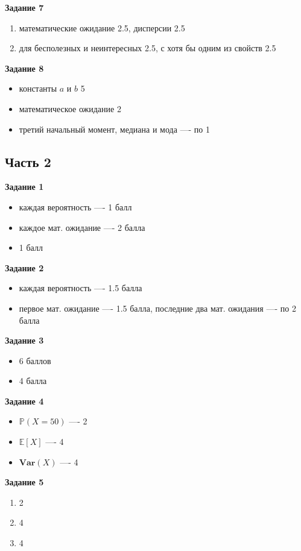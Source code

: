\documentclass[a4paper,12pt]{article}
\theoremstyle{plain}                         %
\theoremstyle{definition}                  %
\theoremstyle{remark}                      %
\begin{document}
\textbf{Задание 7}
\begin{enumerate}
\item математические ожидание 2.5, дисперсии 2.5
\item для бесполезных и неинтересных 2.5, с хотя бы одним из свойств 2.5

\end{enumerate}

\textbf{Задание 8}
\begin{itemize}
\item константы $a$ и $b$ 5
\item математическое ожидание 2
\item третий начальный момент, медиана и мода —- по 1
\end{itemize}

\begin{center}
\subsection*{Часть 2}
\end{center}

\textbf{Задание 1}
\begin{itemize}
\item каждая вероятность —- 1 балл
\item каждое мат. ожидание —- 2 балла
\item 1 балл
\end{itemize}

\textbf{Задание 2}
\begin{itemize}
\item каждая вероятность —- 1.5 балла
\item первое мат. ожидание —- 1.5 балла, последние два мат. ожидания —- по 2 балла

\end{itemize}

\textbf{Задание 3}
\begin{itemize}
\item 6 баллов
\item 4 балла
\end{itemize}
\textbf{Задание 4}
\begin{itemize}
\item $\mathbb{P}(X=50)$ —- 2
\item $\mathbb{E}[X]$ —- 4
\item $\mathbf{Var}(X)$ —- 4
\end{itemize}

\textbf{Задание 5}
\begin{enumerate}
\item 2
\item 4
\item 4
\end{enumerate}
\end{document}
